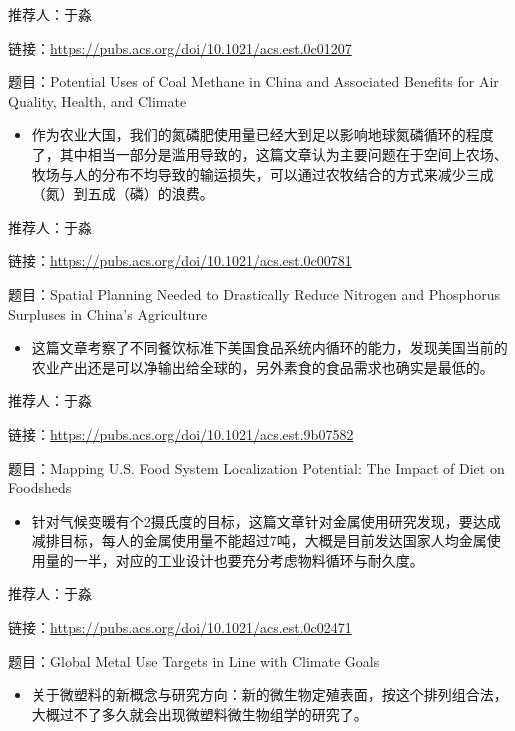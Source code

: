 \documentclass[]{book}
\providecommand{\tightlist}{%
  \setlength{\itemsep}{0pt}\setlength{\parskip}{0pt}}
\begin{document}
推荐人：于淼

链接：\url{https://pubs.acs.org/doi/10.1021/acs.est.0c01207}

题目：Potential Uses of Coal Methane in China and Associated Benefits for Air Quality, Health, and Climate

\begin{itemize}
\tightlist
\item
  作为农业大国，我们的氮磷肥使用量已经大到足以影响地球氮磷循环的程度了，其中相当一部分是滥用导致的，这篇文章认为主要问题在于空间上农场、牧场与人的分布不均导致的输运损失，可以通过农牧结合的方式来减少三成（氮）到五成（磷）的浪费。
\end{itemize}

推荐人：于淼

链接：\url{https://pubs.acs.org/doi/10.1021/acs.est.0c00781}

题目：Spatial Planning Needed to Drastically Reduce Nitrogen and Phosphorus Surpluses in China's Agriculture

\begin{itemize}
\tightlist
\item
  这篇文章考察了不同餐饮标准下美国食品系统内循环的能力，发现美国当前的农业产出还是可以净输出给全球的，另外素食的食品需求也确实是最低的。
\end{itemize}

推荐人：于淼

链接：\url{https://pubs.acs.org/doi/10.1021/acs.est.9b07582}

题目：Mapping U.S. Food System Localization Potential: The Impact of Diet on Foodsheds

\begin{itemize}
\tightlist
\item
  针对气候变暖有个2摄氏度的目标，这篇文章针对金属使用研究发现，要达成减排目标，每人的金属使用量不能超过7吨，大概是目前发达国家人均金属使用量的一半，对应的工业设计也要充分考虑物料循环与耐久度。
\end{itemize}

推荐人：于淼

链接：\url{https://pubs.acs.org/doi/10.1021/acs.est.0c02471}

题目：Global Metal Use Targets in Line with Climate Goals

\begin{itemize}
\tightlist
\item
  关于微塑料的新概念与研究方向：新的微生物定殖表面，按这个排列组合法，大概过不了多久就会出现微塑料微生物组学的研究了。
\end{itemize}
\end{document}
